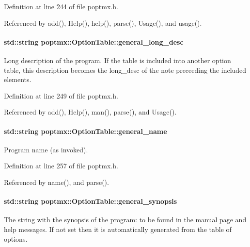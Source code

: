 Definition at line 244 of file poptmx.h.



Referenced by add(), Help(), help(), parse(), Usage(), and usage().

\hypertarget{classpoptmx_1_1OptionTable_a7168462caaba6b939fd66148a4b2715b}{
\paragraph[{general\_\-long\_\-desc}]{\setlength{\rightskip}{0pt plus 5cm}std::string {\bf poptmx::OptionTable::general\_\-long\_\-desc}}\hfill}
\label{classpoptmx_1_1OptionTable_a7168462caaba6b939fd66148a4b2715b}
Long description of the program. If the table is included into another option table, this description becomes the long\_\-desc of the note preceeding the included elements. 

Definition at line 249 of file poptmx.h.



Referenced by add(), Help(), man(), parse(), and Usage().

\hypertarget{classpoptmx_1_1OptionTable_af3cea70107b7b4f19b1fe61232e3e1d8}{
\paragraph[{general\_\-name}]{\setlength{\rightskip}{0pt plus 5cm}std::string {\bf poptmx::OptionTable::general\_\-name}}\hfill}
\label{classpoptmx_1_1OptionTable_af3cea70107b7b4f19b1fe61232e3e1d8}


Program name (as invoked). 



Definition at line 257 of file poptmx.h.



Referenced by name(), and parse().

\hypertarget{classpoptmx_1_1OptionTable_aa68f1825e50e20f036ec9abfdb0e4a24}{
\paragraph[{general\_\-synopsis}]{\setlength{\rightskip}{0pt plus 5cm}std::string {\bf poptmx::OptionTable::general\_\-synopsis}}\hfill}
\label{classpoptmx_1_1OptionTable_aa68f1825e50e20f036ec9abfdb0e4a24}
The string with the synopsis of the program: to be found in the manual page and help messages. If not set then it is automatically generated from the table of options. 

